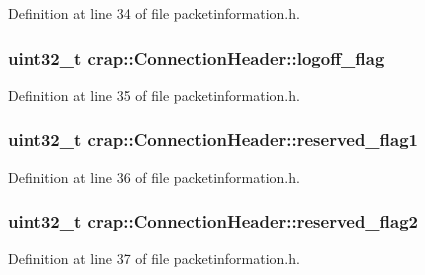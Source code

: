 Definition at line 34 of file packetinformation.\+h.

\hypertarget{structcrap_1_1_connection_header_ab62a0376a8ab247dfa670d7769dc3307}{}
\subsubsection[{logoff\+\_\+flag}]{\setlength{\rightskip}{0pt plus 5cm}uint32\+\_\+t crap\+::\+Connection\+Header\+::logoff\+\_\+flag}\label{structcrap_1_1_connection_header_ab62a0376a8ab247dfa670d7769dc3307}


Definition at line 35 of file packetinformation.\+h.

\hypertarget{structcrap_1_1_connection_header_a9f3b8f11cda04679b59cc0cc38bf4326}{}
\subsubsection[{reserved\+\_\+flag1}]{\setlength{\rightskip}{0pt plus 5cm}uint32\+\_\+t crap\+::\+Connection\+Header\+::reserved\+\_\+flag1}\label{structcrap_1_1_connection_header_a9f3b8f11cda04679b59cc0cc38bf4326}


Definition at line 36 of file packetinformation.\+h.

\hypertarget{structcrap_1_1_connection_header_ade56dffd3ec8971d9900a546bb5b6975}{}
\subsubsection[{reserved\+\_\+flag2}]{\setlength{\rightskip}{0pt plus 5cm}uint32\+\_\+t crap\+::\+Connection\+Header\+::reserved\+\_\+flag2}\label{structcrap_1_1_connection_header_ade56dffd3ec8971d9900a546bb5b6975}


Definition at line 37 of file packetinformation.\+h.

\hypertarget{structcrap_1_1_connection_header_a2dd3b6067b35376ec4c9e272d507ca1e}{}
